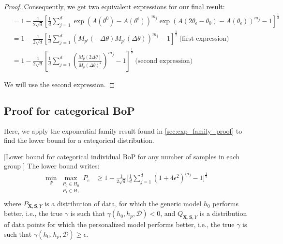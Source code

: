 \begin{proof}
Consequently, we get two equivalent expressions for our final result:
\begin{align*}    
    &= 1 - \frac{1}{2\sqrt{d}}\left[
             \frac{1}{d}
            \sum_{j=1}^d \exp(A(\theta^0)- A(\theta^\epsilon))^{m_j} \exp\left(A(2\theta_\epsilon-\theta_0) - A(\theta_\epsilon)\right)^{m_j}
            -1
            \right]^{\frac{1}{2}}\\
    &= 1 - \frac{1}{2\sqrt{d}}\left[
             \frac{1}{d}
            \sum_{j=1}^d \left( M_{p^\epsilon}(-\Delta \theta)M_{p^\epsilon}(\Delta \theta) \right)^{m_j}
            -1
            \right]^{\frac{1}{2}}~\text{(first expression)}\\
       &= 1 - \frac{1}{2\sqrt{d}}\left[
             \frac{1}{d}
            \sum_{j=1}^d \left( \frac{M_{p}(2\Delta \theta)}{M_{p}(\Delta \theta)^2} \right)^{m_j}
            -1
            \right]^{\frac{1}{2}}~\text{(second expression)}
\end{align*}

We will use the second expression.

\end{proof}

\subsection{Proof for categorical BoP}\label{sec:proof-binary}

Here, we apply the exponential family result found in \ref{sec:exp_family_proof} to find the lower bound for a categorical distribution.

\begin{corollary}
    \label{prop:lower_bound_categorical}
    [Lower bound for categorical individual BoP for any number of samples in each group \citep{monteiro2022epistemic}]\label{th:lower_bound_binary_a}
The lower bound writes:
\begin{align*}
      \min _{\Psi} 
    \max _{\substack{P_0 \in H_0 \\ P_1 \in H_1}}
        P_e 
        &\geq 1 - \frac{1}{2\sqrt{d}} 
        \Bigg[ \frac{1}{d} \sum_{j=1}^d
            \left(1+4\epsilon^2\right)^{m_j}
            -
            1
            \Bigg]^{\frac{1}{2}}\\
\end{align*}
where $P_{\mathbf{X}, \mathbf{S}, Y}$ is a distribution of data, for which the generic model $h_0$ performs better, i.e., the true $\gamma$ is such that $\gamma(h_0, h_p, \mathcal{D}) < 0$, and $Q_{\mathbf{X}, \mathbf{S}, Y}$ is a distribution of data points for which the personalized model performs better, i.e., the true $\gamma$ is such that $\gamma(h_0, h_p, \mathcal{D}) \geq \epsilon$. 
\end{corollary}


